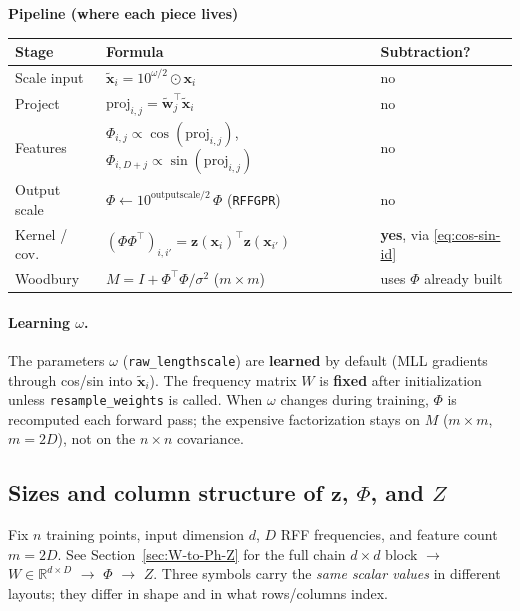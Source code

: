 \documentclass[11pt]{article}
\newcommand{\noise}{\sigma^2}
\newcommand{\Ph}{\Phi}
\newcommand{\Zmat}{Z}
\begin{document}
\begin{samebox}
\textbf{Pipeline (where each piece lives)}
\begin{center}
\renewcommand{\arraystretch}{1.35}
\begin{tabular}{@{}lll@{}}
\toprule
\textbf{Stage} & \textbf{Formula} & \textbf{Subtraction?} \\
\midrule
Scale input & $\tilde{\mathbf x}_i = 10^{\omega/2}\odot \mathbf x_i$ & no \\
Project & $\mathrm{proj}_{i,j}=\tilde{\mathbf w}_j^{\top}\tilde{\mathbf x}_i$ & no \\
Features & $\Ph_{i,j}\propto\cos(\mathrm{proj}_{i,j})$, $\Ph_{i,D+j}\propto\sin(\mathrm{proj}_{i,j})$ & no \\
Output scale & $\Ph \leftarrow 10^{\text{outputscale}/2}\,\Ph$ (\texttt{RFFGPR}) & no \\
Kernel / cov. & $(\Ph\Ph^{\top})_{i,i'}=\mathbf z(\mathbf x_i)^{\top}\mathbf z(\mathbf x_{i'})$ & \textbf{yes}, via \eqref{eq:cos-sin-id} \\
Woodbury & $M=I+\Ph^{\top}\Ph/\noise$ ($m\times m$) & uses $\Ph$ already built \\
\bottomrule
\end{tabular}
\end{center}
\end{samebox}

\paragraph{Learning $\omega$.}
The parameters $\omega$ (\texttt{raw\_lengthscale}) are \textbf{learned} by default (MLL gradients through cos/sin into $\tilde{\mathbf x}_i$).
The frequency matrix $W$ is \textbf{fixed} after initialization unless \texttt{resample\_weights} is called.
When $\omega$ changes during training, $\Ph$ is recomputed each forward pass; the expensive factorization stays on $M$ ($m\times m$, $m=2D$), not on the $n\times n$ covariance.

\subsection{Sizes and column structure of $\mathbf z$, $\Ph$, and $\Zmat$}
\label{sec:notation-zZ}

Fix $n$ training points, input dimension $d$, $D$ RFF frequencies, and feature count $m=2D$.
See Section~\ref{sec:W-to-Ph-Z} for the full chain $d\times d$ block $\to$ $W\in\mathbb{R}^{d\times D}$ $\to$ $\Ph$ $\to$ $\Zmat$.
Three symbols carry the \emph{same scalar values} in different layouts; they differ in shape and in what rows/columns index.
\end{document}
